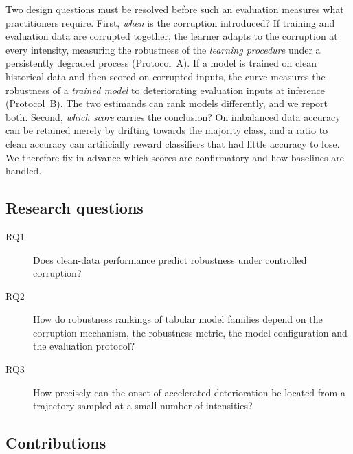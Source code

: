 \documentclass[pdflatex,sn-mathphys]{sn-jnl}
\theoremstyle{thmstyleone}
\theoremstyle{thmstyletwo}
\theoremstyle{thmstylethree}
\begin{document}
Two design questions must be resolved before such an evaluation measures what practitioners require. First, \emph{when} is the corruption introduced? If training and evaluation data are corrupted together, the learner adapts to the corruption at every intensity, measuring the robustness of the \emph{learning procedure} under a persistently degraded process (Protocol~A). If a model is trained on clean historical data and then scored on corrupted inputs, the curve measures the robustness of a \emph{trained model} to deteriorating evaluation inputs at inference (Protocol~B). The two estimands can rank models differently, and we report both. Second, \emph{which score} carries the conclusion? On imbalanced data accuracy can be retained merely by drifting towards the majority class, and a ratio to clean accuracy can artificially reward classifiers that had little accuracy to lose. We therefore fix in advance which scores are confirmatory and how baselines are handled.

\subsection{Research questions}\label{sec:intro:rq}

\begin{description}
\item[RQ1] Does clean-data performance predict robustness under controlled corruption?
\item[RQ2] How do robustness rankings of tabular model families depend on the corruption mechanism, the robustness metric, the model configuration and the evaluation protocol?
\item[RQ3] How precisely can the onset of accelerated deterioration be located from a trajectory sampled at a small number of intensities?
\end{description}

\subsection{Contributions}\label{sec:intro:contrib}
\end{document}
